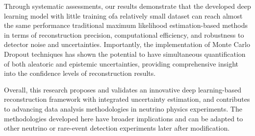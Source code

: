 \begin{enabstract}
Through systematic assessments, our results 
demonstrate that the developed deep learning model 
with little training ofa relatively small dataset 
can reach almost the same performance traditional maximum likelihood 
estimation-based methods in 
terms of reconstruction precision, computational efficiency, 
and robustness to detector noise and uncertainties. Importantly, 
the implementation of Monte Carlo Dropout techniques has 
shown the potential to have  
simultaneous quantification of both aleatoric and epistemic 
uncertainties, providing comprehensive insight into the 
confidence levels of reconstruction results.

Overall, this research proposes and validates an 
innovative deep learning-based reconstruction framework 
with integrated uncertainty estimation, and contributes to 
advancing data analysis methodologies in neutrino physics experiments. 
The methodologies developed here have broader implications and can 
be adapted to other neutrino or rare-event detection experiments 
later after modification.


\end{enabstract}

